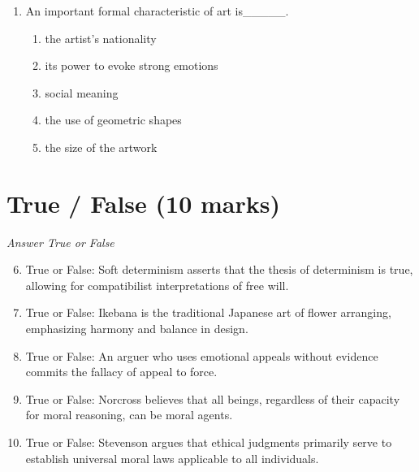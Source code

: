 \documentclass[12pt]{article}
\begin{document}
\begin{enumerate}[label=\arabic*.]
\begin{enumerate}[label=(\alph*)]
    \item provide an account of what makes right actions right.
    \item establish which things are good in themselves.
    \item develop a theory of good moral character.
    \item make ethical questions clear.
\end{enumerate}
\item An important formal characteristic of art is\_\_\_\_\_.
\begin{enumerate}[label=(\alph*)]
    \item the artist's nationality
    \item its power to evoke strong emotions
    \item social meaning
    \item the use of geometric shapes
    \item the size of the artwork
\end{enumerate}
\end{enumerate}

\section*{True / False (10 marks)}
\textit{Answer True or False}
\begin{enumerate}[label=\arabic*.]
\setcounter{enumi}{5}
\item True or False: Soft determinism asserts that the thesis of determinism is true, allowing for compatibilist interpretations of free will.
\item True or False: Ikebana is the traditional Japanese art of flower arranging, emphasizing harmony and balance in design.
\item True or False: An arguer who uses emotional appeals without evidence commits the fallacy of appeal to force.
\item True or False: Norcross believes that all beings, regardless of their capacity for moral reasoning, can be moral agents.
\item True or False: Stevenson argues that ethical judgments primarily serve to establish universal moral laws applicable to all individuals.
\end{enumerate}
\end{document}
